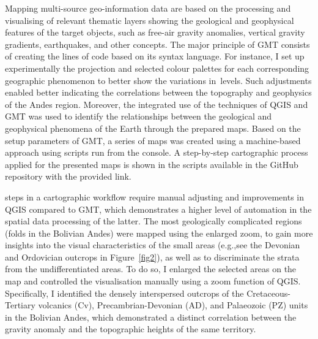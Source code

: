 \documentclass[data,article,accept,pdftex,moreauthors]{Definitions/mdpi}
\begin{document}
{Mapping} multi-source geo-information data are based on {the} processing and visualising {of} relevant thematic layers showing the geological and geophysical features of the target objects{, such as} free-air gravity anomalies, vertical gravity gradients, earthquakes, and other concepts. The major principle of GMT {consists of} creating the {lines} of code based on {its} syntax language. For instance, I set up experimentally the projection and selected colour palettes for each corresponding {geographic} phenomenon to better show the variations \mbox{in levels}{. Such adjustments enabled better} indicating the correlations between the topography and geophysics of the Andes region{. Moreover, the integrated use of the techniques of }QGIS and GMT {was used} to identify the relationships between the geological and geophysical phenomena of the Earth through the prepared maps. Based on the setup parameters of GMT, {a }series of maps {was created using a machine-based approach} using scripts run from the console{. A }step-by-step cartographic process applied for the presented maps {is shown in the scripts available in the GitHub repository with the provided link}.

 steps in {a} cartographic workflow require manual adjusting and improvements in {}QGIS compared to {}GMT, which demonstrates a higher level of automation in the {spatial} data processing {of the latter}. The most geologically complicated regions (folds in the Bolivian Andes) were mapped using {the} enlarged zoom, to gain more insights {into} the visual characteristics of the small areas ({e.g.,}see the Devonian and Ordovician outcrops in Figure~\ref{fig2}), {as well as} to discriminate the strata from the undifferentiated areas. To do so, I {enlarged the} selected areas on the map{ }and controlled {the} visualisation manually using a zoom function of QGIS. Specifically, I identified {the} densely interspersed outcrops of {the} Cretaceous-Tertiary volcanics (Cv), Precambrian-Devonian (AD), and {Palaeozoic} (PZ) units{ }in the Bolivian Andes, which demonstrated a {distinct} correlation {between the} gravity anomaly and {the} topographic heights {of} the same territory. 
\end{document}
